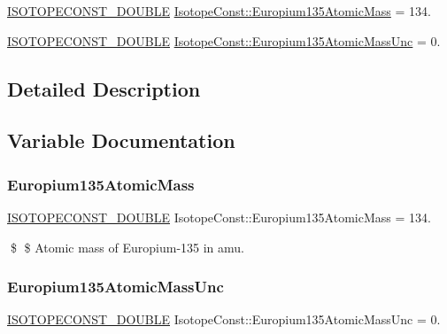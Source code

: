 \begin{DoxyCompactItemize}
\item 
\mbox{\hyperlink{group___isotope_const-_macros_ga8f45a7272ce02c0b4c65c44636ed719a}{I\+S\+O\+T\+O\+P\+E\+C\+O\+N\+S\+T\+\_\+\+D\+O\+U\+B\+LE}} \mbox{\hyperlink{group___isotope_const-_europium-_eu135_ga6b11b6c974fcb53b06d1e9f1d8eee8d1}{Isotope\+Const\+::\+Europium135\+Atomic\+Mass}} = 134.
\item 
\mbox{\hyperlink{group___isotope_const-_macros_ga8f45a7272ce02c0b4c65c44636ed719a}{I\+S\+O\+T\+O\+P\+E\+C\+O\+N\+S\+T\+\_\+\+D\+O\+U\+B\+LE}} \mbox{\hyperlink{group___isotope_const-_europium-_eu135_ga51900147c92b3ade60f29f1afae2a3a0}{Isotope\+Const\+::\+Europium135\+Atomic\+Mass\+Unc}} = 0.
\end{DoxyCompactItemize}


\subsection{Detailed Description}


\subsection{Variable Documentation}
\mbox{\label{group___isotope_const-_europium-_eu135_ga6b11b6c974fcb53b06d1e9f1d8eee8d1}} 
\subsubsection{\texorpdfstring{Europium135\+Atomic\+Mass}{Europium135AtomicMass}}
{\footnotesize\ttfamily \mbox{\hyperlink{group___isotope_const-_macros_ga8f45a7272ce02c0b4c65c44636ed719a}{I\+S\+O\+T\+O\+P\+E\+C\+O\+N\+S\+T\+\_\+\+D\+O\+U\+B\+LE}} Isotope\+Const\+::\+Europium135\+Atomic\+Mass = 134.}

\$ \$ Atomic mass of Europium-\/135 in amu. \mbox{\label{group___isotope_const-_europium-_eu135_ga51900147c92b3ade60f29f1afae2a3a0}} 
\subsubsection{\texorpdfstring{Europium135\+Atomic\+Mass\+Unc}{Europium135AtomicMassUnc}}
{\footnotesize\ttfamily \mbox{\hyperlink{group___isotope_const-_macros_ga8f45a7272ce02c0b4c65c44636ed719a}{I\+S\+O\+T\+O\+P\+E\+C\+O\+N\+S\+T\+\_\+\+D\+O\+U\+B\+LE}} Isotope\+Const\+::\+Europium135\+Atomic\+Mass\+Unc = 0.}

